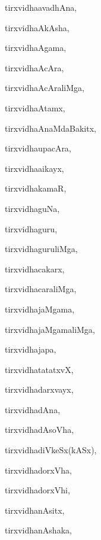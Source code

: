 \begin{multicols}{3}
{\noindent
{tirxvi{dha}avadhAna}, \pageref{tirxvidhaavadhAna}

\noindent
{tirxvi{dha}AkAsha}, \pageref{tirxvidhaAkAsha}

\noindent
{tirxvi{dha}Agama}, \pageref{tirxvidhaAgama}

\noindent
{tirxvi{dha}AcAra}, \pageref{tirxvidhaAcAra}

\noindent
{tirxvi{dha}AcAraliMga}, \pageref{tirxvidhaAcAraliMga}

\noindent
{tirxvi{dha}Atamx}, \pageref{tirxvidhaAtamx}

\noindent
{tirxvi{dha}AnaMdaBakitx}, \pageref{tirxvidhaAnaMdaBakitx}

\noindent
{tirxvi{dha}upacAra}, \pageref{tirxvidhaupacAra}

\noindent
{tirxvi{dha}aikayx}, \pageref{tirxvidhaaikayx}

\noindent
{tirxvidhakamaR}, \pageref{tirxvidhakamaR}

\noindent
{tirxvidhaguNa}, \pageref{tirxvidhaguNa}

\noindent
{tirxvidhaguru}, \pageref{tirxvidhaguru}

\noindent
{tirxvidhaguruliMga}, \pageref{tirxvidhaguruliMga}

\noindent
{tirxvidhacakarx}, \pageref{tirxvidhacakarx}

\noindent
{tirxvidhacaraliMga}, \pageref{tirxvidhacaraliMga}

\noindent
{tirxvidhajaMgama}, \pageref{tirxvidhajaMgama}

\noindent
{tirxvidhajaMgamaliMga}, \pageref{tirxvidhajaMgamaliMga}

\noindent
{tirxvidhajapa}, \pageref{tirxvidhajapa}

\noindent
{tirxvidhatatatxvX}, \pageref{tirxvidhatatatxvX}

\noindent
{tirxvidhadarxvayx}, \pageref{tirxvidhadarxvayx}

\noindent
{tirxvidhadAna}, \pageref{tirxvidhadAna}

\noindent
{tirxvidhadAsoVha}, \pageref{tirxvidhadAsoVha}

\noindent
{tirxvidhadiVkeSx(kASx)}, \pageref{tirxvidhadiVkeSxkASx}

\noindent
{tirxvidhadorxVha}, \pageref{tirxvidhadorxVha}

\noindent
{tirxvidhadorxVhi}, \pageref{tirxvidhadorxVhi}

\noindent
{tirxvidhanAsitx}, \pageref{tirxvidhanAsitx}

\noindent
{tirxvidhanAshaka}, \pageref{tirxvidhanAshaka}

}
\end{multicols}
